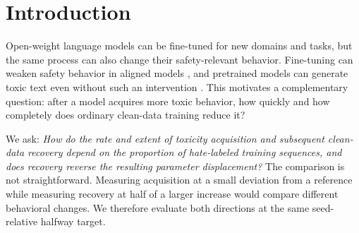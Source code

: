 \begin{abstract}
How quickly does a language model acquire toxic behavior, and how much clean-data training is needed to reduce it? We study this question in a controlled GPT-2-small setting using four proportions of hate-labeled tweets mixed with WikiText-103, three data seeds, and one subsequent epoch of clean training. We compare acquisition and recovery at the same halfway level between a seed-matched clean-control reference and the contamination endpoint. Monotone smoothing and explicit crossing intervals yield per-run asymmetry lower bounds above one, although two of twelve recovery trajectories remain censored at 5,900 recorded steps. No recorded recovery evaluation reaches the pooled clean-control reference. Re-evaluating final checkpoints on generated continuations alone preserves the paired contamination--recovery difference and leaves recovered models at roughly four times the mean clean-control score, while held-out WikiText-103 perplexity does not worsen after recovery. In parameter space, recovery partly opposes the toxicity-associated displacement but largely follows an ordinary second epoch of clean training. Subtracting half of that displacement reduces continuation toxicity to near the clean level at an approximately 2\% perplexity cost. These results establish a protocol-specific difference between rapid acquisition and partial recovery, rather than permanent resistance to recovery.
\end{abstract}

\section{Introduction}
Open-weight language models can be fine-tuned for new domains and tasks, but the same process can also change their safety-relevant behavior. Fine-tuning can weaken safety behavior in aligned models \citep{qi2023fine}, and pretrained models can generate toxic text even without such an intervention \citep{gehman2020realtoxicityprompts}. This motivates a complementary question: after a model acquires more toxic behavior, how quickly and how completely does ordinary clean-data training reduce it?

We ask: \textit{How do the rate and extent of toxicity acquisition and subsequent clean-data recovery depend on the proportion of hate-labeled training sequences, and does recovery reverse the resulting parameter displacement?} The comparison is not straightforward. Measuring acquisition at a small deviation from a reference while measuring recovery at half of a larger increase would compare different behavioral changes. We therefore evaluate both directions at the same seed-relative halfway target.

